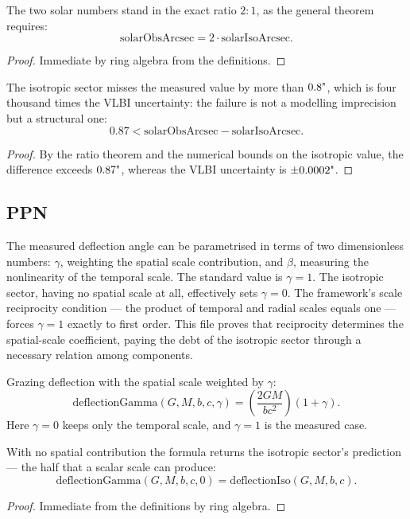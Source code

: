\begin{theorem}
The two solar numbers stand in the exact ratio $2:1$, as the general theorem requires:
\[
\text{solarObsArcsec} = 2 \cdot \text{solarIsoArcsec}.
\]
\begin{proof}
Immediate by ring algebra from the definitions.
\end{proof}
\end{theorem}

\begin{theorem}
The isotropic sector misses the measured value by more than $0.8 \text{\textquotedbl}$, which is four thousand times the VLBI uncertainty: the failure is not a modelling imprecision but a structural one:
\[
0.87 < \text{solarObsArcsec} - \text{solarIsoArcsec}.
\]
\begin{proof}
By the ratio theorem and the numerical bounds on the isotropic value, the difference exceeds $0.87 \text{\textquotedbl}$, whereas the VLBI uncertainty is $\pm 0.0002 \text{\textquotedbl}$.
\end{proof}
\end{theorem}

\subsection{PPN}

The measured deflection angle can be parametrised in terms of two dimensionless numbers: $\gamma$, weighting the spatial scale contribution, and $\beta$, measuring the nonlinearity of the temporal scale. The standard value is $\gamma = 1$. The isotropic sector, having no spatial scale at all, effectively sets $\gamma = 0$. The framework's scale reciprocity condition — the product of temporal and radial scales equals one — forces $\gamma = 1$ exactly to first order. This file proves that reciprocity determines the spatial-scale coefficient, paying the debt of the isotropic sector through a necessary relation among components.

\begin{definition}
Grazing deflection with the spatial scale weighted by $\gamma$:
\[
\text{deflectionGamma}(G, M, b, c, \gamma) = \left(\frac{2GM}{bc^2}\right)(1 + \gamma).
\]
Here $\gamma = 0$ keeps only the temporal scale, and $\gamma = 1$ is the measured case.
\end{definition}

\begin{theorem}
With no spatial contribution the formula returns the isotropic sector's prediction — the half that a scalar scale can produce:
\[
\text{deflectionGamma}(G, M, b, c, 0) = \text{deflectionIso}(G, M, b, c).
\]
\begin{proof}
Immediate from the definitions by ring algebra.
\end{proof}
\end{theorem}

